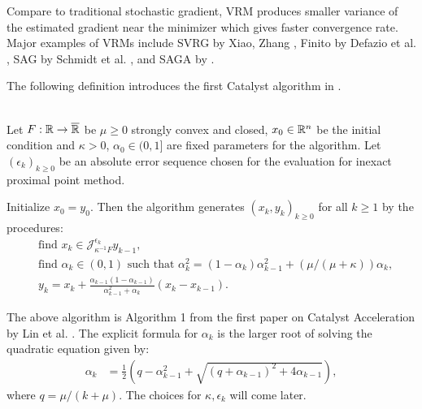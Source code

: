\documentclass[12pt]{article}
\begin{document}
        Compare to traditional stochastic gradient, VRM produces smaller variance of the estimated gradient near the minimizer which gives faster convergence rate. 
        Major examples of VRMs include SVRG by Xiao, Zhang \cite{xiao_proximal_2014}, Finito by Defazio et al. \cite{defazio_finito_2014}, SAG by Schmidt et al. \cite{schmidt_minimizing_2017}, and SAGA by \cite{defazio_saga_2014}. 
        \par
        The following definition introduces the first Catalyst algorithm in \cite{lin_universal_2015}. 
        \begin{definition}\label{def:lin-catalyst-original}\; \\ 
            Let $F:\mathbb R \rightarrow \overline {\mathbb R}$ be $\mu \ge 0$ strongly convex and closed, $x_0 \in \mathbb R^n$ be the initial condition and $\kappa > 0$, $\alpha_0 \in (0, 1]$ are fixed parameters for the algorithm. 
            Let $(\epsilon_k)_{k \ge 0}$ be an absolute error sequence chosen for the evaluation for inexact proximal point method. 
            \begin{tcolorbox}
                Initialize $x_0 = y_0$. Then the algorithm generates $(x_k, y_k)_{k\ge 0}$ for all $k \ge 1$ by the procedures: 
                \begin{align*}
                    & \text{find } x_k \in \mathcal J_{\kappa^{-1}F}^{\epsilon_k} y_{k - 1}, 
                    \\
                    & \text{find } \alpha_k \in (0, 1) \text{ such that } \alpha_k^2 = (1 - \alpha_k)\alpha_{k - 1}^2 + (\mu/(\mu + \kappa))\alpha_k,
                    \\
                    & 
                    y_{k} = x_k + \frac{\alpha_{k - 1}(1 - \alpha_{k - 1})}{\alpha_{k - 1}^2 + \alpha_k}(x_k - x_{k - 1}). 
                \end{align*}
            \end{tcolorbox}
        \end{definition}
        \begin{remark}
            The above algorithm is Algorithm 1 from the first paper on Catalyst Acceleration by Lin et al. \cite{lin_universal_2015}. 
            The explicit formula for $\alpha_k$ is the larger root of solving the quadratic equation given by: 
            \begin{align*}
                \alpha_k &= 
                \frac{1}{2}\left(
                    q - \alpha_{k - 1}^2 + \sqrt{(q + \alpha_{k - 1})^2 + 4 \alpha_{k - 1}}
                \right), 
            \end{align*}
            where $q = \mu/(k + \mu)$. 
            The choices for $\kappa, \epsilon_k$ will come later. 
        \end{remark}
\end{document}
